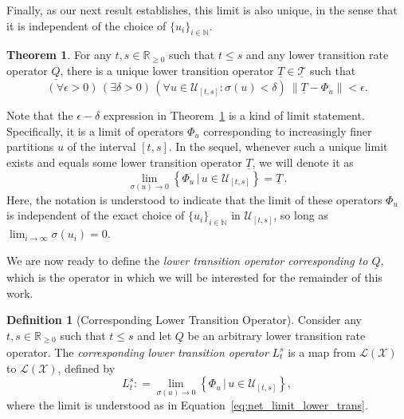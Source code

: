 \documentclass[10pt,a4paper]{paper}
\theoremstyle{definition}
\newtheorem{theorem}{Theorem}
\newtheorem{definition}{Definition}
\newcommand{\nats}{\mathbb{N}}
\newcommand{\reals}{\mathbb{R}}
\newcommand{\realsnonneg}{\reals_{\geq 0}}
\newcommand{\states}{\mathcal{X}}
\newcommand{\lt}{\underline{T}}
\newcommand{\lbound}{L}
\newcommand{\gambles}{\mathcal{L}}
\newcommand{\gamblesX}{\gambles(\states)}
\newcommand{\lrate}{\underline{Q}}
\newcommand{\norm}[1]{\left\lVert #1 \right\rVert}
\newcommand{\coloneqq}{:\!=}
\begin{document}
Finally, as our next result establishes, this limit is also unique, in the sense that it is independent of the choice of $\{u_i\}_{i\in\nats}$.

\begin{theorem}\label{theo:convergencelowerbound}
For any $t,s\in\realsnonneg$ such that $t\leq s$ and any lower transition rate operator $\lrate$, there is a unique lower transition operator $\lt\in\underline{\mathcal{T}}$ such that 
\begin{equation}\label{eq:theo:convergencelowerbound}
(\forall\epsilon>0)\,
(\exists\delta>0)\,
(\forall u\in\mathcal{U}_{[t,s]}\colon\sigma(u)<\delta)~\norm{\lt - \Phi_u}<\epsilon.
\end{equation}
\end{theorem}

Note that the $\epsilon-\delta$ expression in Theorem~\ref{theo:convergencelowerbound} is a kind of limit statement. Specifically, it is a limit of operators $\Phi_{u}$ corresponding to increasingly finer partitions $u$ of the interval $[t,s]$. In the sequel, whenever such a unique limit exists and equals some lower transition operator $\lt$, we will denote it as
\begin{equation}\label{eq:net_limit_lower_trans}
\lim_{\sigma(u)\to0}\left\{\Phi_u\,\big\vert\,u\in\mathcal{U}_{[t,s]}\right\} = \lt\,.
\end{equation}
Here, the notation is understood to indicate that the limit of these operators $\Phi_{u}$ is independent of the exact choice of $\{u_i\}_{i\in\nats}$ in $\mathcal{U}_{[t,s]}$, so long as $\lim_{i\to\infty}\sigma(u_i)=0$.

We are now ready to define the \emph{lower transition operator corresponding to $\lrate$}, which is the operator in which we will be interested for the remainder of this work.

\begin{definition}[Corresponding Lower Transition Operator]\label{def:low_trans}
Consider any $t,s\in\realsnonneg$ such that $t\leq s$ and let $\lrate$ be an arbitrary lower transition rate operator. The \emph{corresponding lower transition operator} $\lbound_t^s$ is a map from $\gamblesX$ to $\gamblesX$, defined by
\begin{equation}\label{eq:lowerbound}
\lbound_t^s\coloneqq\lim_{\sigma(u)\to0}\left\{ \Phi_u\,\big\vert\,u\in\mathcal{U}_{[t,s]}\right\},
\end{equation}
where the limit is understood as in Equation~\eqref{eq:net_limit_lower_trans}.
\end{definition}
\end{document}
